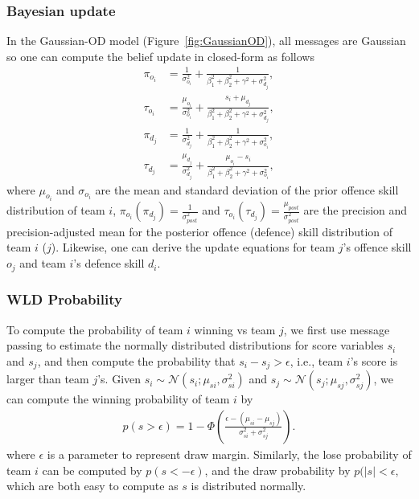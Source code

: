 \subsubsection{Bayesian update} 
In the Gaussian-OD model (Figure~\ref{fig:GaussianOD}), all
messages are Gaussian so one can
compute the belief update in closed-form as follows
\begin{align}
\label{eq:GaussianGraphicalModelsUpdatingEquation}
  \pi_{o_{i}}     &=    \frac{1}{\sigma_{o_{i}}^2} + \frac{1}{\beta_1^2+\beta_2^2+\gamma^2+\sigma_{d_{j}}^2},  \nonumber \\
  \tau_{o_{i}}    &=    \frac{\mu_{o_{i}}}{\sigma_{o_{i}}^2} + \frac{s_i+\mu_{d_{j}}}{\beta_1^2+\beta_2^2+\gamma^2+\sigma_{d_{j}}^2},  \nonumber \\
  \pi_{d_{j}}     &=    \frac{1}{\sigma_{d_{j}}^2} + \frac{1}{\beta_1^2+\beta_2^2+\gamma^2+\sigma_{o_{i}}^2}, \nonumber \\
  \tau_{d_{j}}    &=    \frac{\mu_{d_{j}}}{\sigma_{d_{j}}^2} + \frac{\mu_{o_{i}}-s_i}{\beta_1^2+\beta_2^2+\gamma^2+\sigma_{o_{i}}^2},
\end{align}
\unindentmore where $\mu_{o_{i}}$ and $\sigma_{o_{i}}$ are the mean
and standard deviation of the prior offence skill distribution of team
$i$, $\pi_{o_{i}} (\pi_{d_{j}}) = \frac{1}{\sigma_{\mathit{post}}^2}$
and $\tau_{o_{i}} (\tau_{d_{j}}) =
\frac{\mu_{\mathit{post}}}{\sigma_{\mathit{post}}^2}$ are the
precision and precision-adjusted mean for the posterior offence
(defence) skill distribution of team $i$ ($j$).  Likewise, one can
derive the update equations for team $j$'s offence skill $o_j$ and
team $i$'s defence skill $d_i$.

\subsubsection{WLD Probability} 
To compute the probability of team $i$ winning vs team $j$, we first use message
passing to estimate the normally distributed distributions for score
variables $s_i$ and $s_j$, and then compute the probability that
$s_i-s_j>\epsilon$, i.e., team $i$'s score is larger than team $j$'s. Given
$s_i\sim\mathcal{N}(s_i;\mu_{si},\sigma_{si}^2)$ and
$s_j\sim\mathcal{N}(s_j;\mu_{sj},\sigma_{sj}^2)$, we can compute the
winning probability of team $i$ by
\begin{align}
  p(s>\epsilon) = 1 - \Phi\left(\frac{\epsilon-(\mu_{si}-\mu_{sj})}{\sigma_{si}^2+\sigma_{sj}^2}\right).
\end{align}
where $\epsilon$ is a parameter to represent draw margin. Similarly, the lose probability of team $i$ can be computed by $p(s<-\epsilon)$, and the draw probability by $p(|s|<\epsilon$, which are both easy to compute as $s$ is distributed normally. 

